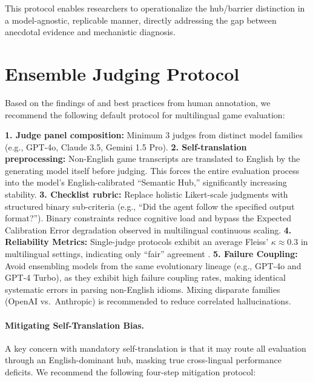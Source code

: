 \documentclass[11pt]{article}
\begin{document}
\noindent This protocol enables researchers to operationalize the hub/barrier distinction in a model-agnostic, replicable manner, directly addressing the gap between anecdotal evidence and mechanistic diagnosis.

\section{Ensemble Judging Protocol}
\label{app:ensemble}

Based on the findings of \citet{fu2025multilingualjudge} and best practices from human annotation, we recommend the following default protocol for multilingual game evaluation:

\noindent \textbf{1. Judge panel composition:} Minimum 3 judges from distinct model families (e.g., GPT-4o, Claude 3.5, Gemini 1.5 Pro). \textbf{2. Self-translation preprocessing:} Non-English game transcripts are translated to English by the generating model itself before judging. This forces the entire evaluation process into the model's English-calibrated ``Semantic Hub,'' significantly increasing stability. \textbf{3. Checklist rubric:} Replace holistic Likert-scale judgments with structured binary sub-criteria (e.g., ``Did the agent follow the specified output format?''). Binary constraints reduce cognitive load and bypass the Expected Calibration Error degradation observed in multilingual continuous scaling. \textbf{4. Reliability Metrics:} Single-judge protocols exhibit an average Fleiss' $\kappa \approx 0.3$ in multilingual settings, indicating only ``fair'' agreement \citep{fu2025multilingualjudge}. \textbf{5. Failure Coupling:} Avoid ensembling models from the same evolutionary lineage (e.g., GPT-4o and GPT-4 Turbo), as they exhibit high failure coupling rates, making identical systematic errors in parsing non-English idioms. Mixing disparate families (OpenAI vs.\ Anthropic) is recommended to reduce correlated hallucinations.

\paragraph{Mitigating Self-Translation Bias.}
A key concern with mandatory self-translation is that it may route all evaluation through an English-dominant hub, masking true cross-lingual performance deficits. We recommend the following four-step mitigation protocol:
\end{document}
